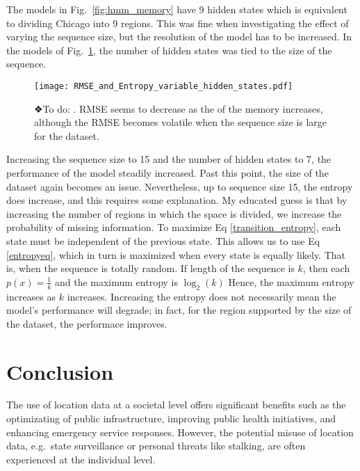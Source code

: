 \documentclass[11pt]{amsart}
\begin{document}
The models in Fig.~\ref{fig:hmm_memory} have 9 hidden states which is equivalent to dividing Chicago into 9 regions.
This was fine when investigating the effect of varying the sequence size, but the resolution of the model has to be increased.
In the models of Fig.~\ref{fig:hmm_hidstate}, the number of hidden states was tied to the size of the sequence.

\begin{figure}[h!]
    \centering
    \texttt{[image: RMSE\_and\_Entropy\_variable\_hidden\_states.pdf]} %
    \caption{❖To do: .
    RMSE seems to decrease as the of the memory increases, although the RMSE becomes volatile when the sequence size is large for the dataset.}
    \label{fig:hmm_hidstate}
\end{figure}
Increasing the sequence size to 15 and the number of hidden states to 7, the performance of the model steadily increased.
Past this point, the size of the dataset again becomes an issue.
Nevertheless, up to sequence size 15, the entropy does increase, and this requires some explanation.
My educated guess is that by increasing the number of regions in which the space is divided, we increase the probability of missing information.
To maximize Eq \ref{transition_entropy}, each state must be independent of the previous state.
This allows us to use Eq \ref{entropyeq}, which in turn is maximized when every state is equally likely.
That is, when the sequence is totally random.
If length of the sequence is $k$, then each $p( x ) = \frac 1 k$ and the maximum entropy is $\log_2( k )$
Hence, the maximum entropy increases as $k$ increases.
Increasing the entropy does not necessarily mean the model's performance will degrade; in fact, for the region supported by the size of the dataset, the performace improves.
\section{Conclusion}

The use of location data at a societal level offers significant benefits such as the optimizating of public infrastructure, improving public health initiatives, and enhancing emergency service responses.
However, the potential misuse of location data, e.g.~state surveillance or personal threats like stalking, are often experienced at the individual level.
\end{document}
